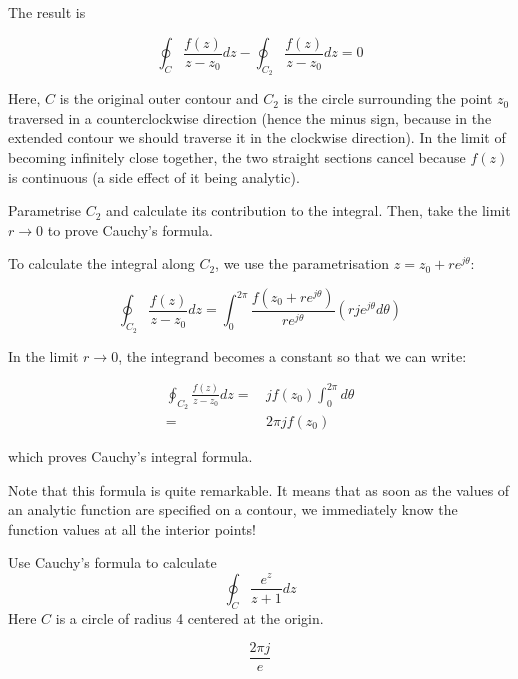 The result is

\begin{equation}
\oint_{{C}} \frac{f(z)} {z-z_0} dz -\oint_{{C}_2} \frac{f(z)}
{z-z_0} dz=0
\end{equation} 

\noindent{}Here, ${C}$ is the original outer contour and ${C}_2$ is the circle surrounding the point $z_0$ traversed in a counterclockwise direction (hence the minus sign, because in the extended contour we should traverse it in the clockwise direction). In the limit of becoming infinitely close together, the two straight sections cancel because $f(z)$ is continuous (a side effect of it being analytic).

\begin{cue}
Parametrise ${C}_2$ and calculate its contribution to the integral. Then, take the limit $ r \to 0 $ to prove Cauchy's formula.   
\end{cue}

To calculate the integral along ${C}_2$, we use the parametrisation $z=z_0 + r e^{j\theta}$:

\begin{equation}
\oint_{{C}_2} \frac{f(z)} {z-z_0} dz = \int_0^{2\pi} \frac{f(z_0
+ r e^{j\theta})} {r e^{j\theta}} \left(rje^{j \theta} d \theta\right)
\end{equation}

\noindent{}In the limit $ r \to 0 $, the integrand becomes a constant so that we can write:

\begin{align}
\oint_{{C}_2} \frac{f(z)} {z-z_0} dz = & \, j f(z_0)  \int_0^{2\pi} d \theta \nonumber \\
 = & \, 2 \pi j f(z_0)
\end{align}
 
which proves Cauchy's integral formula.

Note that this formula is quite remarkable. It means that as soon as the values of an analytic function are specified on a contour, we immediately know the function values at all the interior points!


\begin{exer}
Use Cauchy's formula to calculate 
$$\oint_{{C}}  \frac {e^z} {z+1} dz$$
Here ${C}$ is a circle of radius 4 centered at the origin.
\begin{sol}
$$\frac{2 \pi j}{e}$$
\end{sol}
\end{exer}

